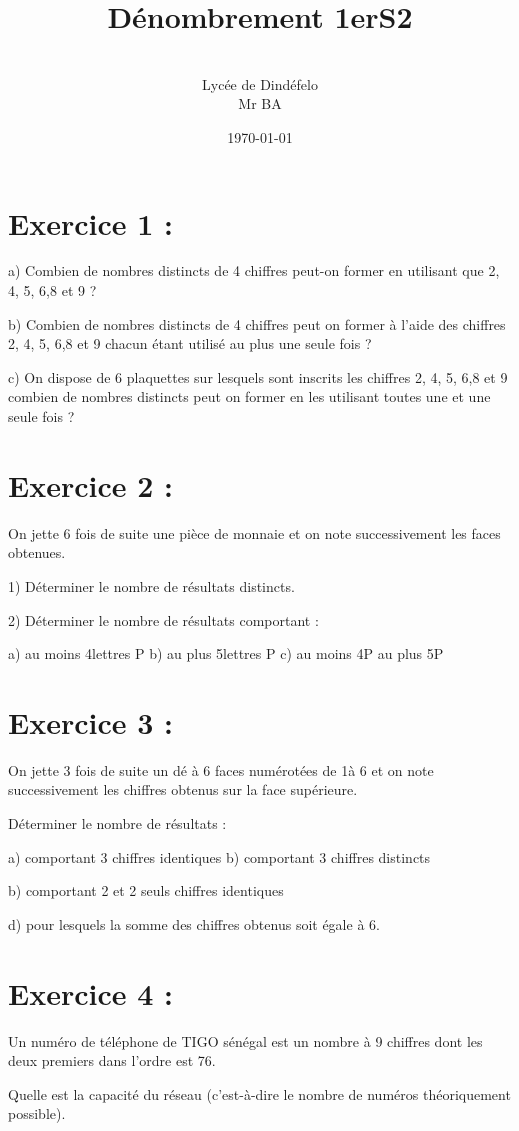 \documentclass[12pt]{article}
\author{\\Lycée de Dindéfelo\\Mr BA}
\title{\textbf{Dénombrement 1erS2}}
\date{\today}
\begin{document}
\maketitle
\newpage
\section*{Exercice 1 :}
    a) Combien de nombres distincts de 4 chiffres peut-on former en utilisant que 2, 4, 5, 6,8  et 9 ?
    
    b) Combien de nombres distincts de 4 chiffres peut on former à l’aide des chiffres 2, 4, 5, 6,8 et 9 chacun étant utilisé au plus une seule fois ?
    
    c) On dispose de 6 plaquettes sur lesquels sont inscrits les chiffres 2, 4, 5, 6,8 et 9 combien de nombres distincts peut on former en les utilisant toutes une et une seule fois ?
\section*{Exercice 2 :}
On jette 6 fois de suite une pièce de monnaie et on note successivement les faces obtenues.

    1) Déterminer le nombre de résultats distincts.
    
    2) Déterminer le nombre de résultats comportant :
    
    a) au moins 4lettres P      b) au plus 5lettres P                    c) au moins 4P au plus 5P
\section*{Exercice 3 :}
On jette 3 fois de suite un dé à 6 faces numérotées de 1à 6 et on note successivement les chiffres obtenus sur la face supérieure.

Déterminer le nombre de résultats :

    a) comportant 3 chiffres identiques                   b) comportant 3 chiffres distincts
    
    b) comportant 2 et 2 seuls chiffres identiques      
    
 d) pour lesquels la somme des chiffres obtenus soit égale à 6.
\section*{Exercice 4 :}
Un numéro de téléphone de TIGO sénégal est un nombre à 9 chiffres dont les deux premiers dans l’ordre est 76.

Quelle est la capacité du réseau (c'est-à-dire le nombre de numéros théoriquement possible).
\end{document}
